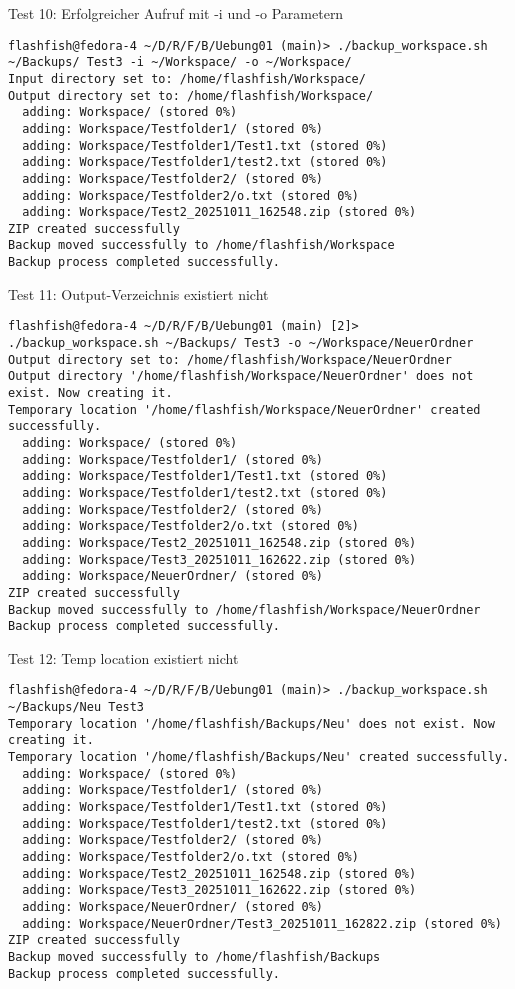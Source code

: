 \documentclass{report}
\begin{document}
Test 10: Erfolgreicher Aufruf mit -i und -o Parametern
\begin{lstlisting}[style=cppstyle, title=\texttt{Terminal Output}]
flashfish@fedora-4 ~/D/R/F/B/Uebung01 (main)> ./backup_workspace.sh ~/Backups/ Test3 -i ~/Workspace/ -o ~/Workspace/
Input directory set to: /home/flashfish/Workspace/
Output directory set to: /home/flashfish/Workspace/
  adding: Workspace/ (stored 0%)
  adding: Workspace/Testfolder1/ (stored 0%)
  adding: Workspace/Testfolder1/Test1.txt (stored 0%)
  adding: Workspace/Testfolder1/test2.txt (stored 0%)
  adding: Workspace/Testfolder2/ (stored 0%)
  adding: Workspace/Testfolder2/o.txt (stored 0%)
  adding: Workspace/Test2_20251011_162548.zip (stored 0%)
ZIP created successfully
Backup moved successfully to /home/flashfish/Workspace
Backup process completed successfully.
\end{lstlisting}
Test 11: Output-Verzeichnis existiert nicht
\begin{lstlisting}[style=cppstyle, title=\texttt{Terminal Output}]
flashfish@fedora-4 ~/D/R/F/B/Uebung01 (main) [2]> ./backup_workspace.sh ~/Backups/ Test3 -o ~/Workspace/NeuerOrdner
Output directory set to: /home/flashfish/Workspace/NeuerOrdner
Output directory '/home/flashfish/Workspace/NeuerOrdner' does not exist. Now creating it.
Temporary location '/home/flashfish/Workspace/NeuerOrdner' created successfully.
  adding: Workspace/ (stored 0%)
  adding: Workspace/Testfolder1/ (stored 0%)
  adding: Workspace/Testfolder1/Test1.txt (stored 0%)
  adding: Workspace/Testfolder1/test2.txt (stored 0%)
  adding: Workspace/Testfolder2/ (stored 0%)
  adding: Workspace/Testfolder2/o.txt (stored 0%)
  adding: Workspace/Test2_20251011_162548.zip (stored 0%)
  adding: Workspace/Test3_20251011_162622.zip (stored 0%)
  adding: Workspace/NeuerOrdner/ (stored 0%)
ZIP created successfully
Backup moved successfully to /home/flashfish/Workspace/NeuerOrdner
Backup process completed successfully.
\end{lstlisting}
Test 12: Temp location existiert nicht
\begin{lstlisting}[style=cppstyle, title=\texttt{Terminal Output}]
flashfish@fedora-4 ~/D/R/F/B/Uebung01 (main)> ./backup_workspace.sh ~/Backups/Neu Test3 
Temporary location '/home/flashfish/Backups/Neu' does not exist. Now creating it.
Temporary location '/home/flashfish/Backups/Neu' created successfully.
  adding: Workspace/ (stored 0%)
  adding: Workspace/Testfolder1/ (stored 0%)
  adding: Workspace/Testfolder1/Test1.txt (stored 0%)
  adding: Workspace/Testfolder1/test2.txt (stored 0%)
  adding: Workspace/Testfolder2/ (stored 0%)
  adding: Workspace/Testfolder2/o.txt (stored 0%)
  adding: Workspace/Test2_20251011_162548.zip (stored 0%)
  adding: Workspace/Test3_20251011_162622.zip (stored 0%)
  adding: Workspace/NeuerOrdner/ (stored 0%)
  adding: Workspace/NeuerOrdner/Test3_20251011_162822.zip (stored 0%)
ZIP created successfully
Backup moved successfully to /home/flashfish/Backups
Backup process completed successfully.
\end{lstlisting}
\end{document}
